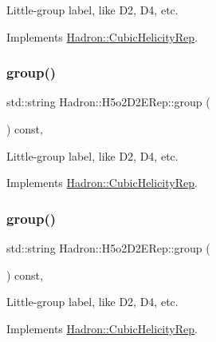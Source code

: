 Little-\/group label, like D2, D4, etc. 

Implements \mbox{\hyperlink{structHadron_1_1CubicHelicityRep_a101a7d76cd8ccdad0f272db44b766113}{Hadron\+::\+Cubic\+Helicity\+Rep}}.

\mbox{\label{structHadron_1_1H5o2D2ERep_aba8c064b1c4731c813d921e68d04d021}} 
\subsubsection{\texorpdfstring{group()}{group()}\hspace{0.1cm}{\footnotesize\ttfamily [3/5]}}
{\footnotesize\ttfamily std\+::string Hadron\+::\+H5o2\+D2\+E\+Rep\+::group (\begin{DoxyParamCaption}{ }\end{DoxyParamCaption}) const\hspace{0.3cm}{\ttfamily [inline]}, {\ttfamily [virtual]}}

Little-\/group label, like D2, D4, etc. 

Implements \mbox{\hyperlink{structHadron_1_1CubicHelicityRep_a101a7d76cd8ccdad0f272db44b766113}{Hadron\+::\+Cubic\+Helicity\+Rep}}.

\mbox{\label{structHadron_1_1H5o2D2ERep_aba8c064b1c4731c813d921e68d04d021}} 
\subsubsection{\texorpdfstring{group()}{group()}\hspace{0.1cm}{\footnotesize\ttfamily [4/5]}}
{\footnotesize\ttfamily std\+::string Hadron\+::\+H5o2\+D2\+E\+Rep\+::group (\begin{DoxyParamCaption}{ }\end{DoxyParamCaption}) const\hspace{0.3cm}{\ttfamily [inline]}, {\ttfamily [virtual]}}

Little-\/group label, like D2, D4, etc. 

Implements \mbox{\hyperlink{structHadron_1_1CubicHelicityRep_a101a7d76cd8ccdad0f272db44b766113}{Hadron\+::\+Cubic\+Helicity\+Rep}}.

